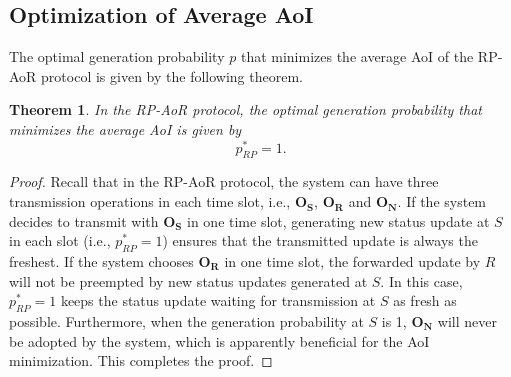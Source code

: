 \documentclass{IEEEtran}
\newtheorem{theorem}{Theorem}
\begin{document}
\subsection{Optimization of Average AoI}
The optimal generation probability $p$ that minimizes the average AoI of the RP-AoR protocol is given by the following theorem.
\begin{theorem}\label{Theorem 4}
In the RP-AoR protocol, the optimal generation probability that minimizes the average AoI is given by 
\begin{equation}
	p_{RP}^*=1.
\end{equation}	
\end{theorem}
\begin{proof}
	Recall that in the RP-AoR protocol, the system can have three transmission operations in each time slot, i.e.,  $\mathbf{O}_{\mathbf{S}}$,  $\mathbf{O}_{\mathbf{R}}$ and  $\mathbf{O}_{\mathbf{N}}$. If the system decides to transmit with $\mathbf{O}_{\mathbf{S}}$ in one time slot, generating new status update at $S$ in each slot (i.e., $p_{RP}^*=1$) ensures that the transmitted update is always the freshest. If the system chooses $\mathbf{O}_{\mathbf{R}}$ in one time slot, the forwarded update by $R$ will not be preempted by new status updates generated at $S$. In this case, $p_{RP}^*=1$ keeps the status update waiting for transmission at $S$ as fresh as possible. Furthermore, when the generation probability at $S$ is 1, $\mathbf{O}_{\mathbf{N}}$ will never be adopted by the system, which is apparently beneficial for the AoI minimization. This completes the proof.   
\end{proof}
\end{document}
